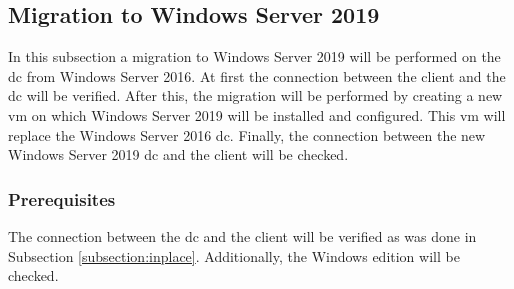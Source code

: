 \subsection{Migration to Windows Server 2019}
In this subsection a migration to Windows Server 2019 will be performed on the \acrshort{dc} from Windows Server 2016. At first the connection between the client and the \acrshort{dc} will be verified. After this, the migration will be performed by creating a new \acrshort{vm} on which Windows Server 2019 will be installed and configured. This \acrshort{vm} will replace the Windows Server 2016 \acrshort{dc}. Finally, the connection between the new Windows Server 2019 \acrshort{dc} and the client will be checked.
\subsubsection{Prerequisites}
The connection between the \acrshort{dc} and the client will be verified as was done in Subsection \ref{subsection:inplace}. Additionally, the Windows edition will be checked.

